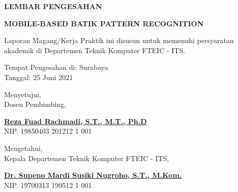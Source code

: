 \begin{center}
  {\Large \textbf{LEMBAR PENGESAHAN}}
  \vspace{6ex}


  {\large \textbf{MOBILE-BASED BATIK PATTERN RECOGNITION}}
  \vspace{6ex}

  Laporan Magang/Kerja Praktik ini disusun untuk memenuhi persyaratan akademik di Departemen Teknik Komputer FTEIC - ITS.
  \vspace{2ex}

  Tempat Pengesahan di: Surabaya \\
  Tanggal: 25 Juni 2021
  \vspace{8ex}

  Menyetujui, \\
  Dosen Pembimbing,
  \vspace{12ex}

  \textbf{\underline{Reza Fuad Rachmadi, S.T., M.T., Ph.D}} \\
  NIP. 19850403 201212 1 001
  \vspace{8ex}

  Mengetahui, \\
  Kepala Departemen Teknik Komputer FTEIC - ITS,
  \vspace{12ex}

  \textbf{\underline{Dr. Supeno Mardi Susiki Nugroho, S.T., M.Kom.}} \\
  NIP. 19700313 199512 1 001

\end{center}